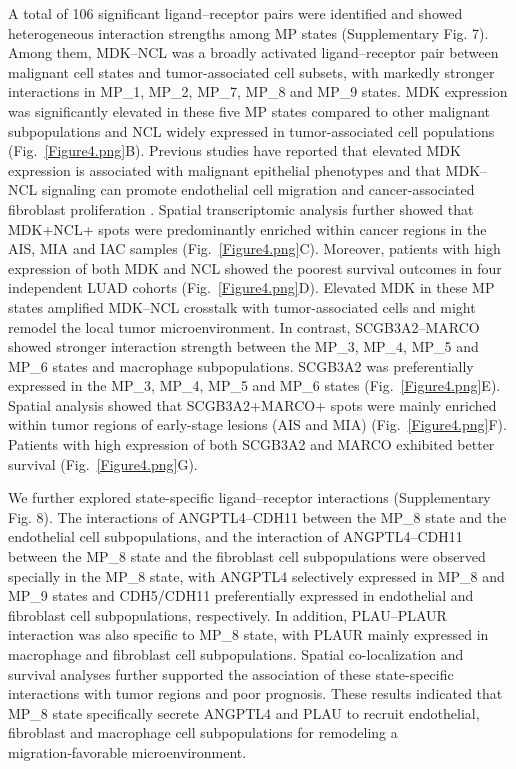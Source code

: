 \documentclass[pdflatex,sn-mathphys-num]{sn-jnl}%
\theoremstyle{thmstyleone}%
\theoremstyle{thmstyletwo}%
\theoremstyle{thmstylethree}%
\begin{document}
A total of 106 significant ligand–receptor pairs were identified and showed heterogeneous interaction strengths among MP states (Supplementary Fig. 7). Among them, MDK--NCL was a broadly activated ligand–receptor pair between malignant cell states and tumor-associated cell subsets, with markedly stronger interactions in MP\_1, MP\_2, MP\_7, MP\_8 and MP\_9 states. MDK expression was significantly elevated in these five MP states compared to other malignant subpopulations and NCL widely expressed in tumor-associated cell populations (Fig.~\ref{Figure4.png}B). Previous studies have reported that elevated MDK expression is associated with malignant epithelial phenotypes and that MDK--NCL signaling can promote endothelial cell migration and cancer-associated fibroblast proliferation \cite {bib17,bib18,bib19}. Spatial transcriptomic analysis further showed that MDK+NCL+ spots were predominantly enriched within cancer regions in the AIS, MIA and IAC samples (Fig.~\ref{Figure4.png}C). Moreover, patients with high expression of both MDK and NCL showed the poorest survival outcomes in four independent LUAD cohorts (Fig.~\ref{Figure4.png}D). Elevated MDK in these MP states amplified MDK–NCL crosstalk with tumor-associated cells and might remodel the local tumor microenvironment.
In contrast, SCGB3A2--MARCO showed stronger interaction strength between the MP\_3, MP\_4, MP\_5 and MP\_6 states and macrophage subpopulations. SCGB3A2 was preferentially expressed in the MP\_3, MP\_4, MP\_5 and MP\_6 states (Fig.~\ref{Figure4.png}E). Spatial analysis showed that SCGB3A2+MARCO+ spots were mainly enriched within tumor regions of early-stage lesions (AIS and MIA) (Fig.~\ref{Figure4.png}F). Patients with high expression of both SCGB3A2 and MARCO exhibited better survival (Fig.~\ref{Figure4.png}G).

We further explored state-specific ligand--receptor interactions (Supplementary Fig. 8). The interactions of ANGPTL4--CDH11 between the MP\_8 state and the endothelial cell subpopulations, and the interaction of ANGPTL4--CDH11 between the MP\_8 state and the fibroblast cell subpopulations were observed specially in the MP\_8 state, with ANGPTL4 selectively expressed in MP\_8 and MP\_9 states and CDH5/CDH11 preferentially expressed in endothelial and fibroblast cell subpopulations, respectively. In addition, PLAU--PLAUR interaction was also specific to MP\_8 state, with PLAUR mainly expressed in macrophage and fibroblast cell subpopulations. Spatial co-localization and survival analyses further supported the association of these state-specific interactions with tumor regions and poor prognosis.
These results indicated that MP\_8 state specifically secrete ANGPTL4 and PLAU to recruit endothelial, fibroblast and macrophage cell subpopulations for remodeling a migration‑favorable microenvironment.
\end{document}
